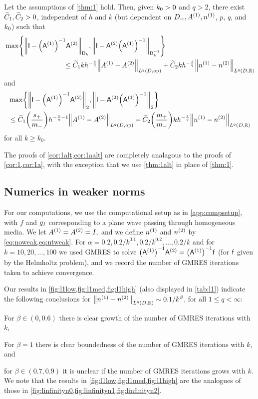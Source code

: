 \begin{theorem}\label{thm:1alt}
Let the assumptions of \cref{thm:1} hold.   Then, given $k_{0}>0$ and $q >2$, there exist $\widetilde{C}_{1}, \widetilde{C}_{2}>0$, independent of $h$ and $k$ (but dependent on $D_{-}, {A}^{(1)}, {n}^{(1)}$, $p$, $q$, and $k_{0}$) such that
\begin{align}\nonumber
&\max\set{\NDk{\Imat - \AmatoI\Amatt},\NDkI{\Imat -\Amatt\AmatoI}}\\
&\hspace{3cm} 
\leq \Cotilde kh^{-\frac{s}q} \NLqDRRdtd{\Aso-\Ast} + \Cttilde  kh^{-\frac{s}q}  \NLqDRR{\nso-\nst}
\label{eq:main1alt}
\end{align}
and 
\begin{align}\nonumber
&\max\set{\Nt{\Imat - \AmatoI\Amatt}, \Nt{\Imat -\Amatt\AmatoI}}\\
&\hspace{0cm}
\leq \Cotilde \mleft(\frac{\splus}{\mminus}\mright) h^{-\frac{s}q-1}\NLqDRRdtd{\Aso-\Ast} + \Cttilde \mleft(\frac{\mplus}{\mminus}\mright) kh^{-\frac{s}q}\NLqDRR{\nso-\nst}
\label{eq:main1aalt}
\end{align}
for all $k\geq k_0$. 
\end{theorem}


The proofs of \cref{cor:1alt,cor:1aalt} are completely analagous to the proofs of \cref{cor:1,cor:1a}, with the exception that we use \cref{thm:1alt} in place of \cref{thm:1}.
\epf


\subsection{Numerics in weaker norms}\label{sec:weakernumerics}
For our computations, we use the computational setup as in \cref{app:compsetup}, with $f$ and $g_{I}$ corresponding to a plane wave passing through homogeneous media.  We let ${A}^{(1)}={A}^{(2)}=I,$ and we define ${n}^{(1)}$ and ${n}^{(2)}$ by \cref{eq:noweak,eq:ntweak}. For $\alpha = 0.2,0.2/k^{0.1},0.2/k^{0.2},\ldots,0.2/k$ and for $k=10,20,\ldots,100$ we used GMRES to solve $\AmatoI\Amatt = \AmatoI \fvec$ (for $\mathsf{f}$ given by the Helmholtz problem), and we record the number of GMRES iterations taken to achieve convergence.

Our results in \cref{fig:l1low,fig:l1med,fig:l1high} (also displayed in \cref{tab:l1}) indicate the following conclusions for $\NLqDRR{\nso-\nst} \sim 0.1/k^{\beta}$, for all $1 \leq q < \infty$:
\bit
\item For $\beta \in (0,0.6)$ there is clear growth of the number of GMRES iterations with $k$,
\item For $\beta = 1$ there is clear boundedness of the number of GMRES iterations with $k$, and
  \item for $\beta \in (0.7,0.9)$ it is unclear if the number of GMRES iterations grows with $k.$
    \eit
We note that the results in \cref{fig:l1low,fig:l1med,fig:l1high} are the analogues of those in \cref{fig:linfinityn0,fig:linfinityn1,fig:linfinityn2}.

